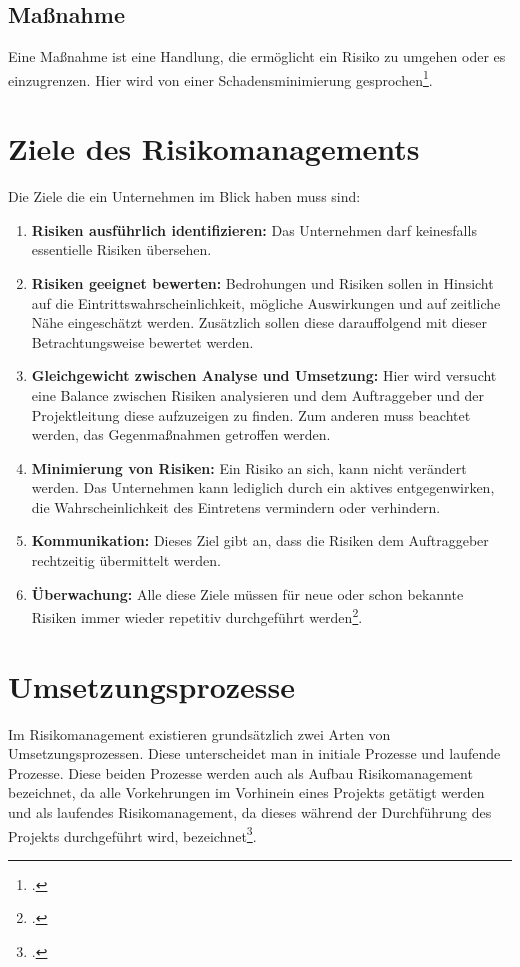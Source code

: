 \subsection{Maßnahme}
Eine Maßnahme ist eine Handlung, die ermöglicht ein Risiko zu umgehen oder es einzugrenzen. Hier wird von einer Schadensminimierung gesprochen\footcite{risikomanagement-diplomarbeit}. 

\section{Ziele des Risikomanagements}
Die Ziele die ein Unternehmen im Blick haben muss sind:
\begin{enumerate}
	\item \textbf{Risiken ausführlich identifizieren:} Das Unternehmen darf keinesfalls essentielle Risiken übersehen.
	\item \textbf{Risiken geeignet bewerten:} Bedrohungen und Risiken sollen in Hinsicht auf die Eintrittswahrscheinlichkeit, mögliche Auswirkungen und auf zeitliche Nähe eingeschätzt werden. Zusätzlich sollen diese darauffolgend mit dieser Betrachtungsweise bewertet werden.
	\item \textbf{Gleichgewicht zwischen Analyse und Umsetzung:} Hier wird versucht eine Balance zwischen Risiken analysieren und dem Auftraggeber und der Projektleitung diese aufzuzeigen zu finden. Zum anderen muss beachtet werden, das Gegenmaßnahmen getroffen werden.
	\item \textbf{Minimierung von Risiken:} Ein Risiko an sich, kann nicht verändert werden. Das Unternehmen kann lediglich durch ein aktives entgegenwirken, die Wahrscheinlichkeit des Eintretens vermindern oder verhindern.
	\item \textbf{Kommunikation:} Dieses Ziel gibt an, dass die Risiken dem Auftraggeber rechtzeitig übermittelt werden.
	\item \textbf{Überwachung:} Alle diese Ziele müssen für neue oder schon bekannte Risiken immer wieder repetitiv durchgeführt werden\footcite{bva-risikomanagement}. 
\end{enumerate}

\section{Umsetzungsprozesse}
Im Risikomanagement existieren grundsätzlich zwei Arten von Umsetzungsprozessen. Diese unterscheidet man in initiale Prozesse und laufende Prozesse.
Diese beiden Prozesse werden auch als Aufbau Risikomanagement bezeichnet, da alle Vorkehrungen im Vorhinein eines Projekts getätigt werden und als laufendes Risikomanagement, da dieses während der Durchführung des Projekts durchgeführt wird, bezeichnet\footcite{bva-risikomanagement}.

